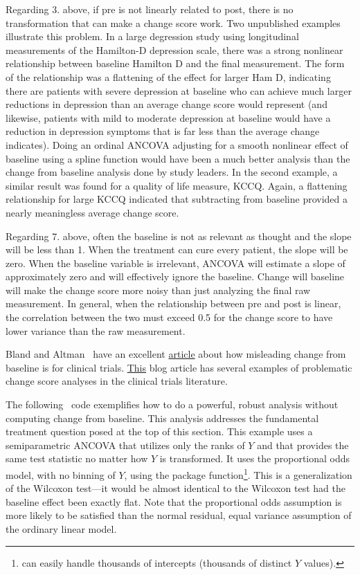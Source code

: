 Regarding 3. above, if pre is not linearly related to post, there is no transformation that can make a change score work.  Two unpublished examples illustrate this problem.  In a large degression study using longitudinal measurements of the Hamilton-D depression scale, there was a strong nonlinear relationship between baseline Hamilton D and the final measurement.  The form of the relationship was a flattening of the effect for larger Ham D, indicating there are patients with severe depression at baseline who can achieve much larger reductions in depression than an average change score would represent (and likewise, patients with mild to moderate depression at baseline would have a reduction in depression symptoms that is far less than the average change indicates).  Doing an ordinal ANCOVA adjusting for a smooth nonlinear effect of baseline using a spline function would have been a much better analysis than the change from baseline analysis done by study leaders.  In the second example, a similar result was found for a quality of life measure, KCCQ.  Again, a flattening relationship for large KCCQ indicated that subtracting from baseline provided a nearly meaningless average change score.

Regarding 7. above, often the baseline is not as relevant as thought and the slope will be less than 1.  When the treatment can cure every patient, the slope will be zero.  When the baseline variable is irrelevant, ANCOVA will estimate a slope of approximately zero and will effectively ignore the baseline.  Change will baseline will make the change score more noisy than just analyzing the final raw measurement.  In general, when the relationship between pre and post is linear, the correlation between the two must exceed 0.5 for the change score to have lower variance than the raw measurement.

Bland and Altman~\cite{bla11com} have an excellent \href{https://www.ncbi.nlm.nih.gov/pmc/articles/PMC3286439}{article} about how misleading change from baseline is for clinical trials.  \href{http://www.fharrell.com/2017/04/statistical-errors-in-medical-literature.html#change}{This} blog article has several examples of problematic change score analyses in the clinical trials literature.

The following \R\ code exemplifies how to do a powerful, robust analysis without computing change from baseline.  This analysis addresses the fundamental treatment question posed at the top of this section.  This example uses a semiparametric ANCOVA that utilizes only the ranks of $Y$ and that provides the same test statistic no matter how $Y$ is transformed.  It uses the proportional odds model, with no binning of $Y$, using the  package  function\footnote{ can easily handle thousands of intercepts (thousands of distinct $Y$ values).}.  This is a generalization of the Wilcoxon test---it would be almost identical to the Wilcoxon test had the baseline effect been exactly flat.  Note that the proportional odds assumption is more likely to be satisfied than the normal residual, equal variance assumption of the ordinary linear model.

